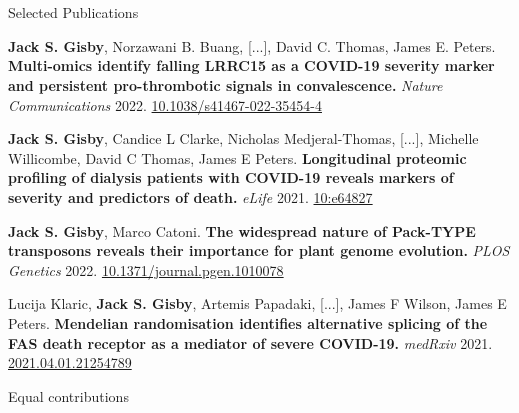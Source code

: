 \section{\faFlask}{Selected Publications}

\resumeEntryStart
    \item \textbf{Jack S. Gisby}\textsuperscript{\textdagger}, Norzawani B. Buang\textsuperscript{\textdagger}, [...], David C. Thomas\textsuperscript{\textdagger}, James E. Peters\textsuperscript{\textdagger}. \textbf{Multi-omics identify falling LRRC15 as a COVID-19 severity marker and persistent pro-thrombotic signals in convalescence.} \textit{Nature Communications} 2022. \href{https://doi.org/10.1038/s41467-022-35454-4}{10.1038/s41467-022-35454-4}
      
    \item \textbf{Jack S. Gisby}\textsuperscript{\textdagger}, Candice L Clarke\textsuperscript{\textdagger}, Nicholas Medjeral-Thomas\textsuperscript{\textdagger}, [...], Michelle Willicombe\textsuperscript{\textdagger}, David C Thomas\textsuperscript{\textdagger}, James E Peters\textsuperscript{\textdagger}. \textbf{Longitudinal proteomic profiling of dialysis patients with COVID-19 reveals markers of severity and predictors of death.} \textit{eLife} 2021. \href{https://doi.org/10.7554/eLife.64827}{10:e64827}
    
    \item \textbf{Jack S. Gisby}, Marco Catoni. \textbf{The widespread nature of Pack-TYPE transposons reveals their importance for plant genome evolution.} \textit{PLOS Genetics} 2022. \href{https://doi.org/10.1371/journal.pgen.1010078}{10.1371/journal.pgen.1010078}
    
    \item Lucija Klaric\textsuperscript{\textdagger}, \textbf{Jack S. Gisby}\textsuperscript{\textdagger}, Artemis Papadaki\textsuperscript{\textdagger}, [...], James F Wilson\textsuperscript{\textdagger}, James E Peters\textsuperscript{\textdagger}. \textbf{Mendelian randomisation identifies alternative splicing of the FAS death receptor as a mediator of severe COVID-19.} \textit{medRxiv} 2021. \href{https://doi.org/10.1101/2021.04.01.21254789 }{2021.04.01.21254789}
    
    \textdagger Equal contributions \hfill {}
    
\resumeEntryEnd
